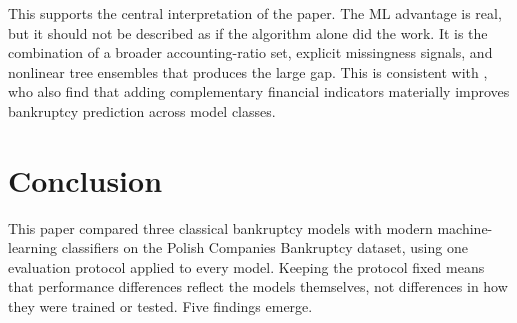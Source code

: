 \documentclass[12pt,a4paper]{article}
\begin{document}
\begin{table}[H]
\centering
\caption{A simple decomposition of the H1 performance gap. Positive numbers
are improvements in AUC or PR-AUC between the two models in the comparison.}
\label{tab:feature-decomp}
\small
{}
\caption*{\footnotesize Source: author's calculations.}
\end{table}

This supports the central interpretation of the paper. The ML advantage is
real, but it should not be described as if the algorithm alone did the work.
It is the combination of a broader accounting-ratio set, explicit missingness
signals, and nonlinear tree ensembles that produces the large gap. This is
consistent with \cite{barboza2017}, who also find that adding complementary
financial indicators materially improves bankruptcy prediction across model
classes.


\clearpage
\section{Conclusion}\label{sec:conclusion}

This paper compared three classical bankruptcy models with modern
machine-learning classifiers on the Polish Companies Bankruptcy dataset,
using one evaluation protocol applied to every model. Keeping the protocol
fixed means that performance differences reflect the models themselves,
not differences in how they were trained or tested. Five findings emerge.
\end{document}
